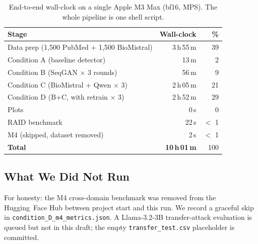 \begin{table}[t]
\caption{End-to-end wall-clock on a single Apple M3 Max
(bf16, MPS). The whole pipeline is one shell script.}
\label{tab:walltime}
\centering
\renewcommand{\arraystretch}{1.1}
\begin{tabular}{@{}lrr@{}}
\toprule
\textbf{Stage} & \textbf{Wall-clock} & \textbf{\%} \\
\midrule
Data prep (1{,}500 PubMed + 1{,}500 BioMistral)
                                & 3\,h\,55\,m & 39 \\
Condition A (baseline detector) & 13\,m       &  2 \\
Condition B (SeqGAN $\times$ 3 rounds)
                                & 56\,m       &  9 \\
Condition C (BioMistral + Qwen $\times$ 3)
                                & 2\,h\,05\,m & 21 \\
Condition D (B+C, with retrain $\times$ 3)
                                & 2\,h\,52\,m & 29 \\
Plots                           & 0\,s        & 0 \\
RAID benchmark                  & 22\,s       & $<$ 1 \\
M4 (skipped, dataset removed)   & 2\,s        & $<$ 1 \\
\midrule
\textbf{Total}                  & \textbf{10\,h\,01\,m} & 100 \\
\bottomrule
\end{tabular}
\end{table}

\subsection{What We Did Not Run}
For honesty: the M4 \cite{wang2024m4} cross-domain benchmark was removed
from the Hugging~Face Hub between project start and this run. We record a
graceful skip in \texttt{condition\_D\_m4\_metrics.json}. A
Llama-3.2-3B transfer-attack evaluation is queued but not in this draft;
the empty \texttt{transfer\_test.csv} placeholder is committed.
